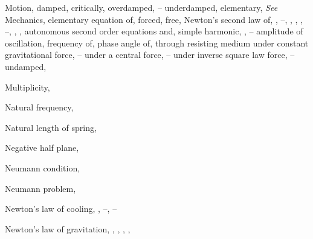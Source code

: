 \begin{theindex}
  \item Motion,
    \subitem damped, \pageref{eq:6.1.1}
      \subsubitem critically, \pageref{example:6.2.1}
      \subsubitem overdamped, \pageref{eq:6.2.3}--\pageref{example:6.2.1}
      \subsubitem underdamped, \pageref{eq:6.2.2}
    \subitem elementary, \emph{See} Mechanics, elementary
    \subitem equation of, \pageref{eq:6.1.2}
    \subitem forced, \pageref{eq:6.1.3}
    \subitem free, \pageref{eq:6.1.3}
    \subitem Newton's second law of, \pageref{eq:1.1.10}, \pageref{eq:4.3.1}--\pageref{eq:4.3.2}, \pageref{eq:4.4.5}, \pageref{eq:4.4.9}, \pageref{eq:4.4.26}, \pageref{eq:4.4.26}--\pageref{example:4.4.5}, \pageref{eq:6.1.1}, \pageref{eq:6.4.2}, \pageref{eq:10.1.14}
      \subsubitem autonomous second order equations and, \pageref{eq:4.4.6}
    \subitem simple harmonic, \pageref{eq:4.4.12}, \pageref{example:6.1.1}--\pageref{example:6.1.3}
      \subsubitem amplitude of oscillation, \pageref{eq:6.1.10}
      \subsubitem frequency of, \pageref{example:6.1.2}
      \subsubitem phase angle of, \pageref{eq:6.1.10}
    \subitem through resisting medium under constant gravitational force, \pageref{example:4.3.1}--\pageref{eq:4.3.17}
    \subitem under a central force, \pageref{exer:6.3.17}--\pageref{exer:6.4.6}
    \subitem under inverse square law force, \pageref{eq:6.4.10}--\pageref{exer:6.4.1}
    \subitem undamped, \pageref{eq:6.1.1}

  \item Multiplicity, \pageref{eq:9.2.14} 

  \item Natural frequency, \pageref{example:6.1.2}

  \item Natural length of spring, \pageref{eq:6.1.1}

  \item Negative half plane, \pageref{figure:10.5.1}

  \item Neumann condition, \pageref{eq:12.3.2}

  \item Neumann problem, \pageref{eq:12.3.2}

  \item Newton's law of cooling, \pageref{eq:1.1.5}, \pageref{eq:4.2.1}--\pageref{example:4.2.1}, \pageref{exer:4.2.1}--\pageref{exer:4.2.23}

  \item Newton's law of gravitation, \pageref{eq:4.3.1}, \pageref{exer:4.4.17}, \pageref{exer:6.3.17}, \pageref{example:10.1.3}, \pageref{exer:10.2.4}


\end{theindex}
